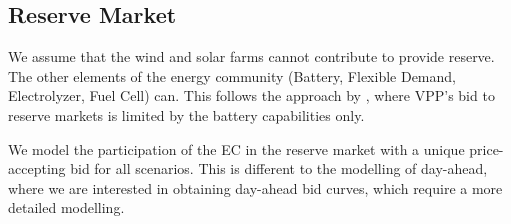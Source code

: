 \documentclass{article}
\begin{document}
\subsection{Reserve Market}

We assume that the wind and solar farms cannot contribute to provide reserve. The other elements of the energy community (Battery, Flexible Demand, Electrolyzer, Fuel Cell) can. This follows the approach by \textcite{Heredia18}, where VPP's bid to reserve markets is limited by the battery capabilities only.

We model the participation of the EC in the reserve market with a unique price-accepting bid for all scenarios. This is different to the modelling of day-ahead, where we are interested in obtaining day-ahead bid curves, which require a more detailed modelling.

\end{document}
